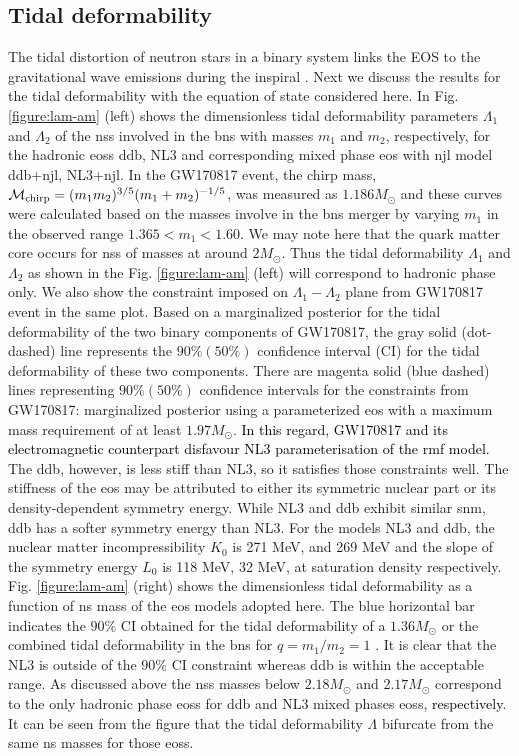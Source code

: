 \documentclass[a4paper, 11pt]{article}
\newcommand{\magenta}[1]{\textcolor{black}{#1}}
\begin{document}
\subsection{Tidal deformability}
The tidal distortion of neutron stars in a binary system links the EOS to the gravitational wave emissions during the inspiral \cite{Patra:2020}. Next we discuss the results for the tidal deformability with the equation of state considered here. In Fig. \ref{figure:lam-am} (left) shows the dimensionless tidal deformability parameters $\Lambda_1$ and $\Lambda_2$ of the \ac{ns}s involved in the \ac{bns} with masses $m_1$ and $m_2$, respectively, for the hadronic \ac{eos}s \ac{ddb}, NL3 and corresponding mixed phase \ac{eos} with \ac{njl} model \ac{ddb}+\ac{njl}, NL3+\ac{njl}. In the GW170817 event, the chirp mass, $\mathcal{M}_{\rm chirp} = ({m_{1}m_{2}})^{3/5}(m_{1}+m_{2})^{-1/5}$, was measured as $1.186 M_{\odot}$ \cite{Ligo:2018} and these curves were calculated based on the masses involve in the \ac{bns} merger by varying $m_1$ in the observed range $1.365 < m_1 < 1.60$. We may note here that the quark matter core occurs for \ac{ns}s of masses at around $2M_{\odot}$. Thus the tidal deformability $\Lambda_1$ and $\Lambda_2$ as shown in the Fig. \ref{figure:lam-am} (left) will correspond to hadronic phase only. We also show the constraint imposed on $\Lambda_1-\Lambda_2$ plane from GW170817 event in the same plot. Based on a marginalized posterior for the tidal deformability of the two binary components of GW170817, the gray solid (dot-dashed) line represents the $90\% (50\%)$ confidence interval (CI)
 for the tidal deformability of these two components. There are magenta solid (blue dashed) lines representing
 $90\% (50\%)$ confidence intervals for the constraints from GW170817: marginalized posterior using 
a parameterized \ac{eos} with a maximum mass requirement of at least $1.97M_{\odot}$. \magenta{In this regard, 
GW170817 and its electromagnetic counterpart disfavour NL3 parameterisation of the \ac{rmf} model.} 
The \ac{ddb}, however, is less stiff than NL3, so it satisfies those constraints well. The stiffness of 
the \ac{eos} may be attributed to either its symmetric nuclear part or its density-dependent symmetry energy. 
While NL3 and \ac{ddb} exhibit similar \ac{snm}, \ac{ddb} has a softer symmetry energy than NL3. 
For the models NL3 and \ac{ddb}, the nuclear matter incompressibility $K_0$ is 271 MeV, and 269 MeV 
and the slope of the symmetry energy $L_0$ is 118 MeV, 32 MeV, at saturation density respectively. 
Fig. \ref{figure:lam-am} (right) shows the dimensionless tidal deformability as a function of \ac{ns} mass of the
 \ac{eos} models adopted here. The blue horizontal bar indicates the $90\%$ CI obtained for the tidal 
deformability of a $1.36 M_{\odot}$ or the combined tidal deformability in the \ac{bns} for $q=m_1/m_2=1$ \cite{Ligo:2018}. It is clear that the NL3 is outside of the $90\%$ CI constraint whereas \ac{ddb} is within the acceptable range. As discussed above the \ac{ns}s masses below $2.18M_{\odot}$ and $2.17M_{\odot}$ correspond to the only hadronic phase \ac{eos}s for \ac{ddb} and NL3 mixed phases \ac{eos}s, \magenta{respectively}. It can be seen from the figure that the tidal deformability $\Lambda$ bifurcate from the same \ac{ns} masses for those \ac{eos}s.
\end{document}
